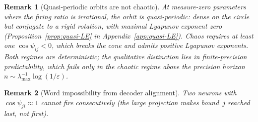 \documentclass[12pt]{article}
\newtheorem{remark}{Remark}
\begin{document}
\begin{remark}[Quasi-periodic orbits are not chaotic]\label{app-rem:quasi-vs-chaos}
At measure-zero parameters where the firing ratio is irrational, the orbit is \emph{quasi-periodic}: dense on the circle but conjugate to a rigid rotation, with maximal Lyapunov exponent zero (Proposition~\ref{prop:quasi-LE} in Appendix~\ref{app:quasi-LE}). Chaos requires at least one $\cos\psi_{ij}<0$, which breaks the cone and admits positive Lyapunov exponents. Both regimes are deterministic; the qualitative distinction lies in finite-precision predictability, which fails only in the chaotic regime above the precision horizon $n\sim\lambda_{\max}^{-1}\log(1/\varepsilon)$.
\end{remark}

\begin{remark}[Word impossibility from decoder alignment]\label{app-rem:impossible}
Two neurons with $\cos\psi_{ji}\approx 1$ cannot fire consecutively (the large projection makes bound~$j$ reached last, not first).
\end{remark}






\end{document}
